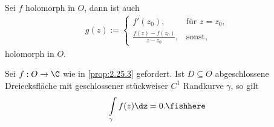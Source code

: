 \begin{bsp}
\label{bsp:2.40}
Sei $f$ holomorph in $O$, dann ist auch
\begin{align*}
g(z) :=
\begin{cases}
f'(z_0), & \text{für } z=z_0,\\
\frac{f(z)-f(z_0)}{z-z_0}, & \text{sonst},
\end{cases}
\end{align*}
holomorph in $O$.\bsphere
\end{bsp}

\begin{prop}[Hilfssatz]
\label{prop:2.41}
Sei $f:O\to\C$ wie in \ref{prop:2.25.3} gefordert. Ist $D\subseteq O$
abgeschlossene Dreiecksfläche mit geschlossener stückweiser $C^1$ Randkurve
$\gamma$, so gilt
\begin{align*}
\int\limits_\gamma f(z)\dz = 0.\fishhere
\end{align*}
\end{prop}

